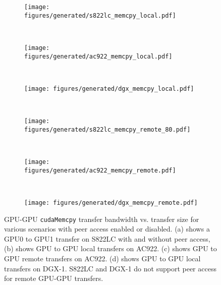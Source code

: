 \begin{figure}[H]
	\centering
	\begin{subfigure}[b]{0.3\textwidth}
		\texttt{[image: figures/generated/s822lc\_memcpy\_local.pdf]}
		\caption{}
		\label{fig:explicit-s822lc-gpu-gpu-local}
	\end{subfigure}
	~
	\begin{subfigure}[b]{0.3\textwidth}
		\texttt{[image: figures/generated/ac922\_memcpy\_local.pdf]}
		\caption{}
		\label{fig:explicit-ac922-gpu-gpu-local}
	\end{subfigure}
	~
	\begin{subfigure}[b]{0.3\textwidth}
		\texttt{[image: figures/generated/dgx\_memcpy\_local.pdf]}
		\caption{}
		\label{fig:explicit-dgx-gpu-gpu-local}
	\end{subfigure}
	\\
	\begin{subfigure}[b]{0.3\textwidth}
		\texttt{[image: figures/generated/s822lc\_memcpy\_remote\_80.pdf]}
		\caption{}
		\label{fig:explicit-s822lc-gpu-gpu-remote}
	\end{subfigure}
	~
	\begin{subfigure}[b]{0.3\textwidth}
		\texttt{[image: figures/generated/ac922\_memcpy\_remote.pdf]}
		\caption{}
		\label{fig:explicit-ac922-gpu-gpu-remote}
	\end{subfigure}
	~
	\begin{subfigure}[b]{0.3\textwidth}
		\texttt{[image: figures/generated/dgx\_memcpy\_remote.pdf]}
		\caption{}
		\label{fig:explicit-dgx-gpu-gpu-remote}
	\end{subfigure}
	\caption[GPU-GPU \texttt{cudaMemcpy} bandwidth and peer access]{
		GPU-GPU \texttt{cudaMemcpy} transfer bandwidth vs. transfer size for various scenarios with peer access enabled or disabled.
		(a) shows a GPU0 to GPU1 transfer on S822LC with and without peer access,
		(b) shows GPU to GPU local transfers on AC922.
		(c) shows GPU to GPU remote transfers on AC922.
		(d) shows GPU to GPU local transfers on DGX-1.
		S822LC and DGX-1 do not support peer access for remote GPU-GPU transfers.
	}
	\label{fig:explicit-peer}
\end{figure}

